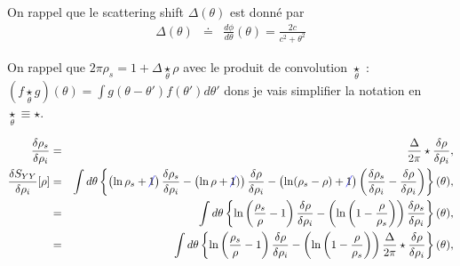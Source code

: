 	
	On rappel que le scattering shift $\Delta(\theta ) $ est donné par
	\begin{eqnarray*}
		\Delta( \theta ) & \doteq & \frac{d \phi }{d \theta } ( \theta ) = \frac{ 2c} { c^2 + \theta^2}	
	\end{eqnarray*}
	
	On rappel que $2 \pi \rho_s = 1 + \Delta \underset{\theta}{\star} \rho $ avec le produit de convolution $\underset{\theta}{\star} $ :  $(f \underset{\theta}{\star} g ) ( \theta) =  \int g( \theta - \theta' ) f(\theta' ) d \theta' $ dons je vais simplifier la notation en $\underset{\theta}{\star} \equiv \star $.
	
	\begin{eqnarray}
		\frac{\delta \rho_s }{ \delta \rho_i }  & = & \frac{ \Delta}{2 \pi} \star \frac{\delta \rho }{ \delta \rho_i } , \\
		\frac{ \delta S_{YY} }{ \delta \rho_i } [\rho ]  & = & \int  d\theta\left \{   \left ( \ln  \rho_s + {\color{blue} \cancel{ \color{black}1}}  \right )\frac{\delta \rho_s }{ \delta \rho_i } - \left (  \ln \rho + {\color{blue} \cancel{ \color{black}1}} ) \right )\frac{\delta \rho }{ \delta \rho_i }   -   \left ( \ln ( \rho_s -\rho ) +  {\color{blue} \cancel{ \color{black} 1}}  \right ) \left ( \frac{\delta \rho_s }{ \delta \rho_i } - \frac{\delta \rho }{ \delta \rho_i }  \right )\right  \} ( \theta )  ,\\
		& = & \int  d\theta \left \{ \ln \left ( \frac{ \rho_s}{ \rho} - 1 \right )\frac{\delta \rho }{ \delta \rho_i } -  \left ( \ln \left ( 1 - \frac{ \rho}{ \rho_s}\right ) \right )\frac{\delta \rho_s }{ \delta \rho_i } \right \} ( \theta ) , \\
		& = & \int  d\theta \left \{ \ln \left ( \frac{ \rho_s}{ \rho} - 1 \right )\frac{\delta \rho }{ \delta \rho_i } -  \left ( \ln \left ( 1 - \frac{ \rho}{ \rho_s}\right ) \right )\frac{ \Delta}{2 \pi} \star \frac{\delta \rho }{ \delta \rho_i } \right \} ( \theta ) ,
	\end{eqnarray}
	
